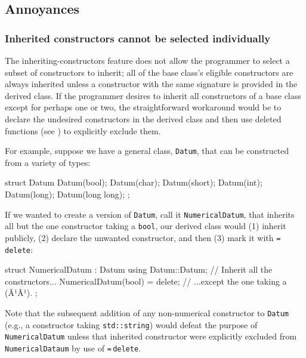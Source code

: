 \subsection[Annoyances]{Annoyances}\label{annoyances-inheritingctor}

\subsubsection[Inherited constructors cannot be selected individually]{Inherited constructors cannot be selected individually}\label{inherited-constructors-cannot-be-selected-individually}

The inheriting-constructors feature does not allow the programmer
to select a subset of constructors to inherit; all of the base
class's eligible constructors are always inherited unless a constructor
with the same signature is provided in the derived class. If the
programmer desires to inherit all constructors of a base class except
for perhaps one or two, the straightforward workaround would be to
declare the undesired constructors in the derived class and then use
deleted functions (see ) 
to explicitly exclude them.

For example, suppose we have a general class, \lstinline!Datum!, that can
be constructed from a variety of types:

\begin{emcppslisting}[language=C++]
struct Datum
{
    Datum(bool);
    Datum(char);
    Datum(short);
    Datum(int);
    Datum(long);
    Datum(long long);
};
\end{emcppslisting}
    
\noindent If we wanted to create a version of \lstinline!Datum!, call it
\lstinline!NumericalDatum!, that inherits all but the one constructor
taking a \lstinline!bool!, our derived class would (1) inherit publicly, 
(2) declare the unwanted constructor, and then (3) mark it with
\lstinline!=!\,\lstinline!delete!:

\begin{emcppslisting}[language=C++]
struct NumericalDatum : Datum
{
    using Datum::Datum;             // Inherit all the constructors...
    NumericalDatum(bool) = delete;  // ...except the one taking a (Ã¹{}Ã¹).
};
\end{emcppslisting}
    
\noindent Note that the subsequent addition of any non-numerical constructor to
\lstinline!Datum! (e.g., a constructor taking \lstinline!std::string!) would
defeat the purpose of \lstinline!NumericalDatum! unless that inherited constructor were explicitly excluded from \lstinline!NumericalDataum! by use of \lstinline!=!\,\lstinline!delete!.

